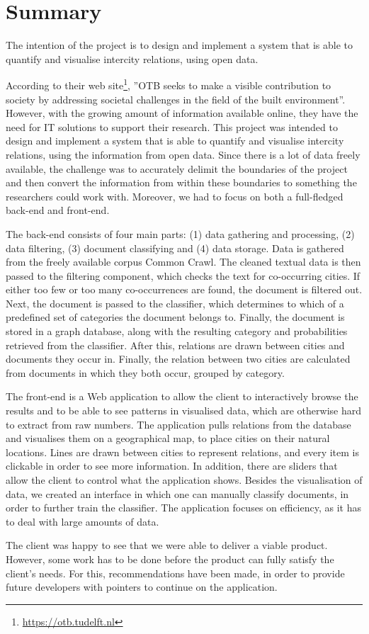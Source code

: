 \chapter*{Summary}
The intention of the project is to design and implement a system that is able to quantify and visualise intercity relations, using open data. 

According to their web site\footnote{\url{https://otb.tudelft.nl}}, ”OTB seeks to make a visible contribution to society by addressing societal challenges in the field of the built environment”. However, with the growing amount of information available online, they have the need for IT solutions to support their research. This project was intended to design and implement a system that is able to quantify and visualise intercity relations, using the information from open data. Since there is a lot of data freely available, the challenge was to accurately delimit the boundaries of the project and then convert the information from within these boundaries to something the researchers could work with. Moreover, we had to focus on both a full-fledged back-end and front-end. 

The back-end consists of four main parts: (1) data gathering and processing, (2) data filtering, (3) document classifying and (4) data storage. Data is gathered from the freely available corpus Common Crawl. The cleaned textual data is then passed to the filtering component, which checks the text for co-occurring cities. If either too few or too many co-occurrences are found, the document is filtered out. Next, the document is passed to the classifier, which determines to which of a predefined set of categories the document belongs to. Finally, the document is stored in a graph database, along with the resulting category and probabilities retrieved from the classifier. After this, relations are drawn between cities and documents they occur in. Finally, the relation between two cities are calculated from documents in which they both occur, grouped by category.

The front-end is a Web application to allow the client to interactively browse the results and to be able to see patterns in visualised data, which are otherwise hard to extract from raw numbers. The application pulls relations from the database and visualises them on a geographical map, to place cities on their natural locations. Lines are drawn between cities to represent relations, and every item is clickable in order to see more information. In addition, there are sliders that allow the client to control what the application shows. Besides the visualisation of data, we created an interface in which one can manually classify documents, in order to further train the classifier. The application focuses on efficiency, as it has to deal with large amounts of data.

The client was happy to see that we were able to deliver a viable product. However, some work has to be done before the product can fully satisfy the client’s needs. For this, recommendations have been made, in order to provide future developers with pointers to continue on the application.